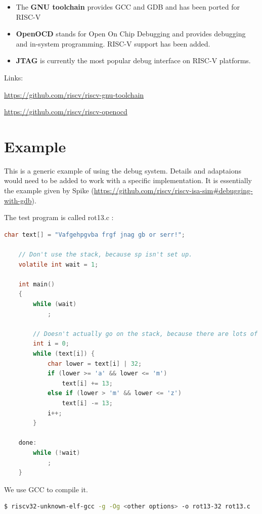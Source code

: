 \documentclass{article}
\begin{document}
	\vspace{-\topsep}
	\begin{itemize}
	\item The \textbf{GNU toolchain} provides GCC and GDB and has been ported for RISC-V
	\item \textbf{OpenOCD} stands for Open On Chip Debugging and provides debugging and in-system programming. RISC-V support has been added.
	\item \textbf{JTAG} is currently the most popular debug interface on RISC-V platforms.
	\end{itemize}
	
	Links:
	
	\url{https://github.com/riscv/riscv-gnu-toolchain}
	
	\url{https://github.com/riscv/riscv-openocd}
	
	
	\newpage
	\section{Example}
	
	This is a generic example of using the debug system. Details and adaptaions would need to be added to work with a specific implementation. It is essentially the example given by Spike (\url{https://github.com/riscv/riscv-isa-sim#debugging-with-gdb}).
	
	The test program is called rot13.c :
	
	\begin{lstlisting}[language=C]
	char text[] = "Vafgehpgvba frgf jnag gb or serr!";
	
	// Don't use the stack, because sp isn't set up.
	volatile int wait = 1;
	
	int main()
	{
	    while (wait)
	        ;
	
	    // Doesn't actually go on the stack, because there are lots of GPRs.
	    int i = 0;
	    while (text[i]) {
	        char lower = text[i] | 32;
	        if (lower >= 'a' && lower <= 'm')
	            text[i] += 13;
	        else if (lower > 'm' && lower <= 'z')
	            text[i] -= 13;
	        i++;
	    }
	
	done:
	    while (!wait)
	        ;
	}
    \end{lstlisting}
    
    We use GCC to compile it.
    
    \begin{lstlisting}[language=bash]
	$ riscv32-unknown-elf-gcc -g -Og <other options> -o rot13-32 rot13.c
    \end{lstlisting}
    
\end{document}
